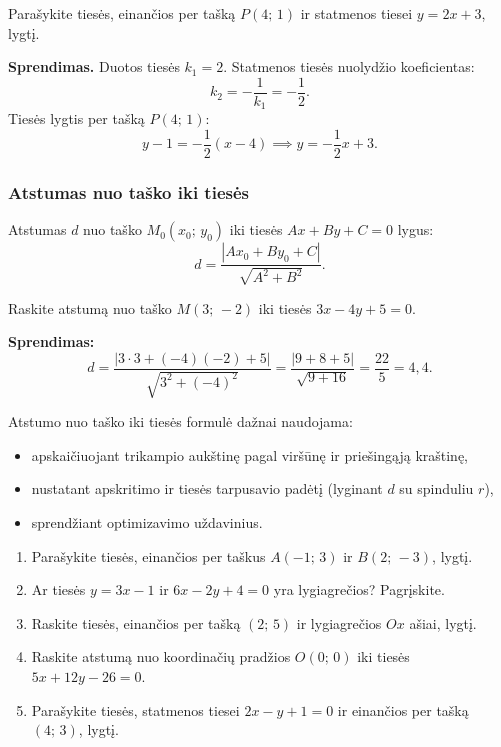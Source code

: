 \begin{example}
Parašykite tiesės, einančios per tašką $P(4;\,1)$ ir statmenos tiesei $y = 2x + 3$, lygtį.

\textbf{Sprendimas.} Duotos tiesės $k_1 = 2$. Statmenos tiesės nuolydžio koeficientas:
\[
    k_2 = -\frac{1}{k_1} = -\frac{1}{2}.
\]
Tiesės lygtis per tašką $P(4;\,1)$:
\[
    y - 1 = -\frac{1}{2}(x - 4) \implies y = -\frac{1}{2}x + 3.
\]
\end{example}

\subsubsection*{Atstumas nuo taško iki tiesės}

\begin{theorem}
Atstumas $d$ nuo taško $M_0(x_0;\, y_0)$ iki tiesės $Ax + By + C = 0$ lygus:
\[
    d = \frac{|A x_0 + B y_0 + C|}{\sqrt{A^2 + B^2}}.
\]
\end{theorem}

\begin{example}
Raskite atstumą nuo taško $M(3;\, -2)$ iki tiesės $3x - 4y + 5 = 0$.

\textbf{Sprendimas:}
\[
    d = \frac{|3 \cdot 3 + (-4)(-2) + 5|}{\sqrt{3^2 + (-4)^2}} = \frac{|9 + 8 + 5|}{\sqrt{9 + 16}} = \frac{22}{5} = 4{,}4.
\]
\end{example}

\begin{remark}
Atstumo nuo taško iki tiesės formulė dažnai naudojama:
\begin{itemize}
    \item apskaičiuojant trikampio aukštinę pagal viršūnę ir priešingąją kraštinę,
    \item nustatant apskritimo ir tiesės tarpusavio padėtį (lyginant $d$ su spinduliu $r$),
    \item sprendžiant optimizavimo uždavinius.
\end{itemize}
\end{remark}

\begin{exercise}
\begin{enumerate}[label=\alph*)]
    \item Parašykite tiesės, einančios per taškus $A(-1;\,3)$ ir $B(2;\,-3)$, lygtį.
    \item Ar tiesės $y = 3x - 1$ ir $6x - 2y + 4 = 0$ yra lygiagrečios? Pagrįskite.
    \item Raskite tiesės, einančios per tašką $(2;\,5)$ ir lygiagrečios $Ox$ ašiai, lygtį.
    \item Raskite atstumą nuo koordinačių pradžios $O(0;\,0)$ iki tiesės $5x + 12y - 26 = 0$.
    \item Parašykite tiesės, statmenos tiesei $2x - y + 1 = 0$ ir einančios per tašką $(4;\,3)$, lygtį.
\end{enumerate}
\end{exercise}

